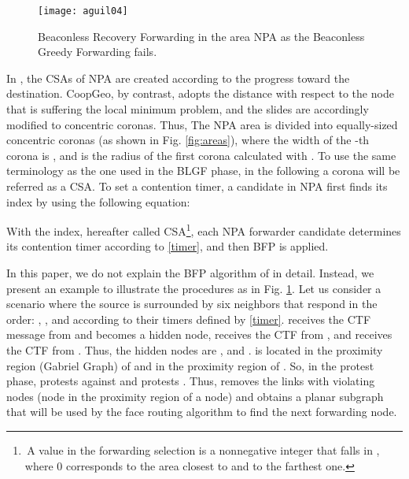 \documentclass[journal,twoside,final]{IEEEtran}
\begin{document}
\begin{figure}[t]
  \centering
  \texttt{[image: aguil04]}      \caption{Beaconless Recovery Forwarding in the area NPA as the Beaconless Greedy Forwarding fails.}\label{fig:RecoBFP}
\end{figure}

In \cite{Sanchez2007}, the CSAs of NPA are created according to the progress toward the destination. CoopGeo, by contrast, adopts the distance with respect to the node that is suffering the local minimum problem, and the slides are accordingly modified to concentric coronas. Thus, The NPA area is divided into  equally-sized concentric coronas (as shown in Fig. \ref{fig:areas}), where the width of the -th corona is , and  is the radius of the first corona calculated with . To use the same terminology as the one used in the BLGF phase, in the following a corona will be referred as a CSA. To set a contention timer, a candidate  in NPA first finds its  index by using the following equation:

With the  index, hereafter called CSA\footnote{\,A   value in the  forwarding selection is a nonnegative integer that falls in , where 0 corresponds to the area closest to  and  to the farthest one.}, each NPA forwarder candidate determines its contention timer according to \eqref{timer}, and then BFP is applied.

\begin{comment}
In the recovery forwarding of CoopGeo, the contention timer setting based on the use of concentric CSAs allows that:

\begin{enumerate}
  \item Nodes located in the -th CSA broadcast their  messages before the nodes in the -th CSA, where .
  \item The collision probability can be reduced in the case that neighbors in the same CSA with the same distance between the current source and them. This is because the second term  in \eqref{timer} guarantees that nodes choose different times to send CTF messages.
\end{enumerate}
\end{comment}

In this paper, we do not explain the BFP algorithm of \cite{Kalosha2008} in detail. Instead, we present an example to illustrate the procedures as in Fig. \ref{fig:RecoBFP}. Let us consider a scenario where the source  is surrounded by six neighbors that respond in the order: , , and  according to their timers defined by \eqref{timer}.  receives the CTF message from  and becomes a hidden node,  receives the CTF from , and  receives the CTF from . Thus, the hidden nodes are ,  and .  is located in the proximity region (Gabriel Graph) of  and  in the proximity region of . So, in the protest phase,  protests against  and  protests . Thus,  removes the links with violating nodes (node in the proximity region of a node) and obtains a planar subgraph that will be used by the face routing algorithm to find the next forwarding node.
\end{document}

